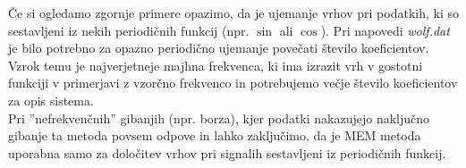 \documentclass[slovene,11pt,a4paper]{article}
\numberwithin{equation}{section} %
\numberwithin{figure}{section} %
\numberwithin{table}{section} %
\begin{document}
Če si ogledamo zgornje primere opazimo, da je ujemanje vrhov pri podatkih, ki so sestavljeni iz nekih periodičnih funkcij (npr. $\sin$ ali $\cos$). Pri napovedi \textsl{wolf.dat} je bilo potrebno za opazno periodično ujemanje povečati število koeficientov. Vzrok temu je najverjetneje majhna frekvenca, ki ima izrazit vrh v gostotni funkciji v primerjavi z vzorčno frekvenco in potrebujemo večje število koeficientov za opis sistema.\\
Pri ''nefrekvenčnih'' gibanjih (npr. borza), kjer podatki nakazujejo naključno gibanje ta metoda povsem odpove in lahko zaključimo, da je MEM metoda uporabna samo za določitev vrhov pri signalih sestavljeni iz periodičnih funkcij.

\end{document}
